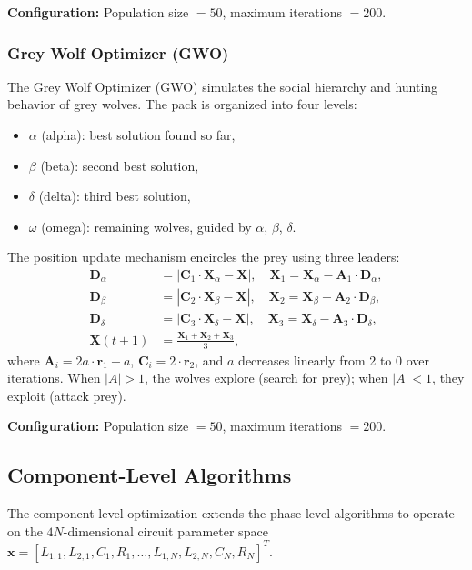 \documentclass[12pt,a4paper]{article}
\newcommand{\mat}[1]{\mathbf{#1}}
\begin{document}
\textbf{Configuration:} Population size $= 50$, maximum iterations $= 200$.

\subsubsection{Grey Wolf Optimizer (GWO)}
\label{sec:gwo}

The Grey Wolf Optimizer (GWO) \cite{mirjalili2014grey} simulates the social hierarchy and hunting behavior of grey wolves. The pack is organized into four levels:
\begin{itemize}
    \item $\alpha$ (alpha): best solution found so far,
    \item $\beta$ (beta): second best solution,
    \item $\delta$ (delta): third best solution,
    \item $\omega$ (omega): remaining wolves, guided by $\alpha$, $\beta$, $\delta$.
\end{itemize}

The position update mechanism encircles the prey using three leaders:
\begin{align}
    \mat{D}_\alpha &= |\mat{C}_1 \cdot \mat{X}_\alpha - \mat{X}|, \quad \mat{X}_1 = \mat{X}_\alpha - \mat{A}_1 \cdot \mat{D}_\alpha, \\
    \mat{D}_\beta &= |\mat{C}_2 \cdot \mat{X}_\beta - \mat{X}|, \quad \mat{X}_2 = \mat{X}_\beta - \mat{A}_2 \cdot \mat{D}_\beta, \\
    \mat{D}_\delta &= |\mat{C}_3 \cdot \mat{X}_\delta - \mat{X}|, \quad \mat{X}_3 = \mat{X}_\delta - \mat{A}_3 \cdot \mat{D}_\delta, \\
    \mat{X}(t+1) &= \frac{\mat{X}_1 + \mat{X}_2 + \mat{X}_3}{3},
\end{align}
where $\mat{A}_i = 2a \cdot \mat{r}_1 - a$, $\mat{C}_i = 2 \cdot \mat{r}_2$, and $a$ decreases linearly from 2 to 0 over iterations. When $|A| > 1$, the wolves explore (search for prey); when $|A| < 1$, they exploit (attack prey).

\textbf{Configuration:} Population size $= 50$, maximum iterations $= 200$.

\subsection{Component-Level Algorithms}

The component-level optimization extends the phase-level algorithms to operate on the $4N$-dimensional circuit parameter space $\mat{x} = [L_{1,1}, L_{2,1}, C_1, R_1, \ldots, L_{1,N}, L_{2,N}, C_N, R_N]^T$.
\end{document}
